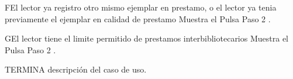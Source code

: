 		\begin{UCtrayectoriaA}{F}{El lector ya registro otro mismo ejemplar en prestamo, o el lector ya tenia previamente el ejemplar en calidad de prestamo}
			\UCpaso[\UCsist] Muestra el 
			\UCpaso[\UCactor] Pulsa 
			\UCpaso[\UCsist] Paso 2 .
		\end{UCtrayectoriaA}
			
		\begin{UCtrayectoriaA}{G}{El lector tiene el limite permitido de prestamos interbibliotecarios}
			\UCpaso[\UCsist] Muestra el 
			\UCpaso[\UCactor] Pulsa 
			\UCpaso[\UCsist] Paso 2 .
		\end{UCtrayectoriaA}
TERMINA descripción del caso de uso.



